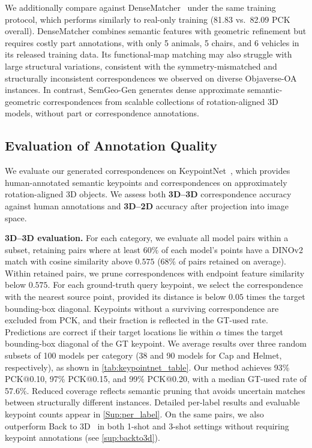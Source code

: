 We additionally compare against DenseMatcher~\cite{zhu2025densematcher}
under the same training protocol, which performs similarly to
real-only training (81.83 vs.\ 82.09 PCK overall).
DenseMatcher combines semantic features with geometric refinement
but requires costly part annotations, with only 5 animals, 5 chairs,
and 6 vehicles in its released training data.
Its functional-map matching may also struggle with large structural
variations, consistent with the symmetry-mismatched and structurally
inconsistent correspondences we observed on diverse Objaverse-OA instances.
In contrast, SemGeo-Gen generates dense approximate semantic-geometric
correspondences from scalable collections of rotation-aligned 3D models,
without part or correspondence annotations.



\subsection{Evaluation of Annotation Quality}
\label{annotation_quality}

We evaluate our generated correspondences on KeypointNet~\cite{you2020},
which provides human-annotated semantic keypoints and correspondences
on approximately rotation-aligned 3D objects.
We assess both \textbf{3D--3D} correspondence accuracy against human
annotations and \textbf{3D--2D} accuracy after projection into image space.

\noindent\textbf{3D--3D evaluation.}
For each category, we evaluate all model pairs within a subset,
retaining pairs where at least $60\%$ of each model's points have
a DINOv2 match with cosine similarity above $0.575$
($68\%$ of pairs retained on average).
Within retained pairs, we prune correspondences with endpoint
feature similarity below $0.575$.
For each ground-truth query keypoint, we select the correspondence
with the nearest source point, provided its distance is below
$0.05$ times the target bounding-box diagonal.
Keypoints without a surviving correspondence are excluded from PCK,
and their fraction is reflected in the GT-used rate.
Predictions are correct if their target locations lie within
$\alpha$ times the target bounding-box diagonal of the GT keypoint.
We average results over three random subsets of 100 models per
category (38 and 90 models for Cap and Helmet, respectively),
as shown in \autoref{tab:keypointnet_table}.
Our method achieves 93\% PCK@0.10, 97\% PCK@0.15,
and 99\% PCK@0.20, with a median GT-used rate of 57.6\%.
Reduced coverage reflects semantic pruning that avoids
uncertain matches between structurally different instances.
Detailed per-label results and evaluable keypoint counts
appear in \autoref{Sup:per_label}.
On the same pairs, we also outperform Back to 3D~\cite{wimmer2024back}
in both 1-shot and 3-shot settings without requiring keypoint
annotations (see \autoref{sup:backto3d}).


